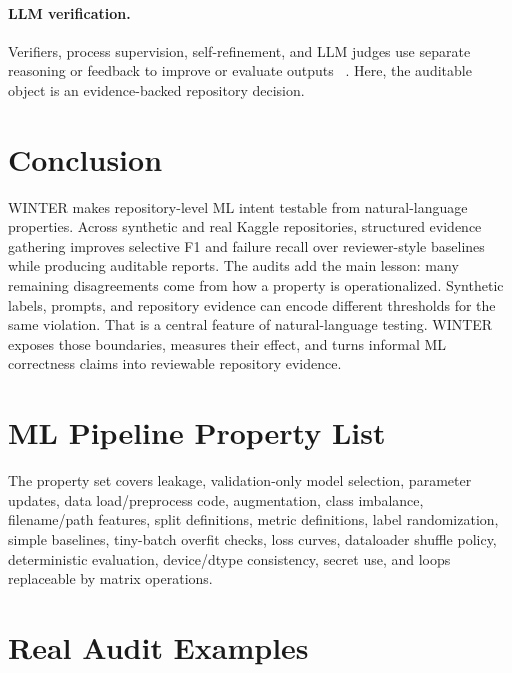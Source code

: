 \documentclass[11pt]{article}
\newcommand{\vibetest}{\textsc{WINTER}}
\begin{document}
\paragraph{LLM verification.}
Verifiers, process supervision, self-refinement, and LLM judges use separate
reasoning or feedback to improve or evaluate outputs
~\citep{cobbe2021verifier,lightman2024process,madaan2023selfrefine,
weng2023selfverification,zheng2023judge,tan2025judgebench}.
Here, the auditable object is an evidence-backed repository decision.

\section{Conclusion}

\vibetest{} makes repository-level ML intent testable from natural-language
properties. Across synthetic and real Kaggle repositories, structured evidence
gathering improves selective F1 and failure recall over reviewer-style baselines
while producing auditable reports.
The audits add the main lesson: many remaining disagreements come from how a
property is operationalized. Synthetic labels, prompts, and repository evidence
can encode different thresholds for the same violation.
That is a central feature of natural-language testing. \vibetest{} exposes
those boundaries, measures their effect, and turns informal ML correctness
claims into reviewable repository evidence.



\appendix

\section{ML Pipeline Property List}
\label{app:properties}

The property set covers leakage, validation-only model selection, parameter
updates, data load/preprocess code, augmentation, class imbalance,
filename/path features, split definitions, metric definitions, label
randomization, simple baselines, tiny-batch overfit checks, loss curves,
dataloader shuffle policy, deterministic evaluation, device/dtype consistency,
secret use, and loops replaceable by matrix operations.

\section{Real Audit Examples}
\end{document}
